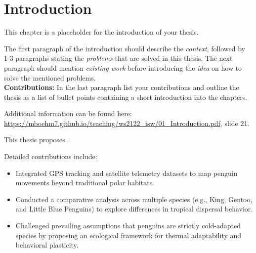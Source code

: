 \newcommand{\package}{\emph}

\chapter{Introduction}
\label{cha:introduction}

This chapter is a placeholder for the introduction of your thesis. 

The first paragraph of the introduction should describe the \emph{context}, followed by 1-3 paragraphs stating the \emph{problems} that are solved in this thesis.
The next paragraph should mention \emph{existing work} before introducing the \emph{idea} on how to solve the mentioned problems.\\


\textbf{Contributions:}
In the last paragraph list your contributions and outline the thesis as a list of bullet points containing a short introduction into the chapters. 

Additional information can be found here: \url{https://mboehm7.github.io/teaching/ws2122_isw/01_Introduction.pdf}, slide 21.




This thesis proposes...

Detailed contributions include:

\begin{itemize}
    \item Integrated GPS tracking and satellite telemetry datasets to map penguin movements beyond traditional polar habitats.
    \item Conducted a comparative analysis across multiple species (e.g., King, Gentoo, and Little Blue Penguins) to explore differences in tropical dispersal behavior.
    \item Challenged prevailing assumptions that penguins are strictly cold-adapted species by proposing an ecological framework for thermal adaptability and behavioral plasticity.
\end{itemize}

